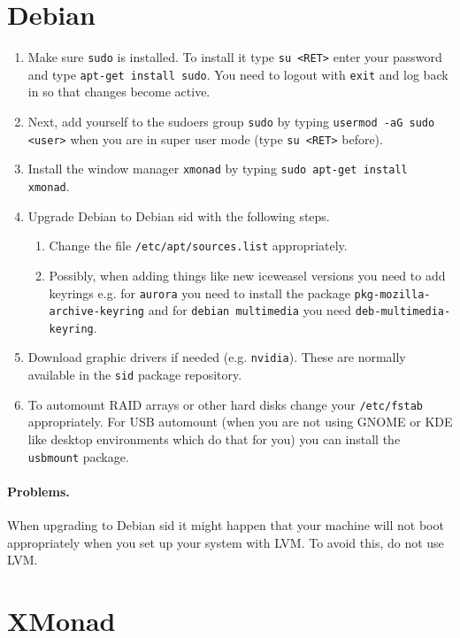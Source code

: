 \documentclass{article}
\begin{document}
\section{Debian}

\begin{enumerate}
        \item Make sure \texttt{sudo} is installed. To install it type \texttt{su <RET>} enter your password and type \texttt{apt-get install sudo}. You need to logout with \texttt{exit} and log back in so that changes become active.
        \item Next, add yourself to the sudoers group \texttt{sudo} by typing \texttt{usermod -aG sudo <user>} when you are in super user mode (type \texttt{su <RET>} before).
        \item Install the window manager \texttt{xmonad} by typing \texttt{sudo apt-get install xmonad}.
        \item Upgrade Debian to Debian sid with the following steps.
    \begin{enumerate}
            \item Change the file \texttt{/etc/apt/sources.list} appropriately.
            \item Possibly, when adding things like new iceweasel versions you need to add keyrings e.g. for
        \texttt{aurora} you need to install the package \texttt{pkg-mozilla-archive-keyring} and for \texttt{debian multimedia} you need \texttt{deb-multimedia-keyring}.
    \end{enumerate}
        \item Download graphic drivers if needed (e.g. \texttt{nvidia}). These are normally available in the \texttt{sid} package repository.
        \item To automount RAID arrays or other hard disks change your \texttt{/etc/fstab} appropriately. For USB automount (when you are not using GNOME or KDE like desktop environments which do that for you) you can install the \texttt{usbmount} package.
\end{enumerate}

\paragraph{Problems.} When upgrading to Debian sid it might happen that your machine will not boot appropriately when you set up your system with LVM. To avoid this, do not use LVM. 

\section{XMonad}
\end{document}

